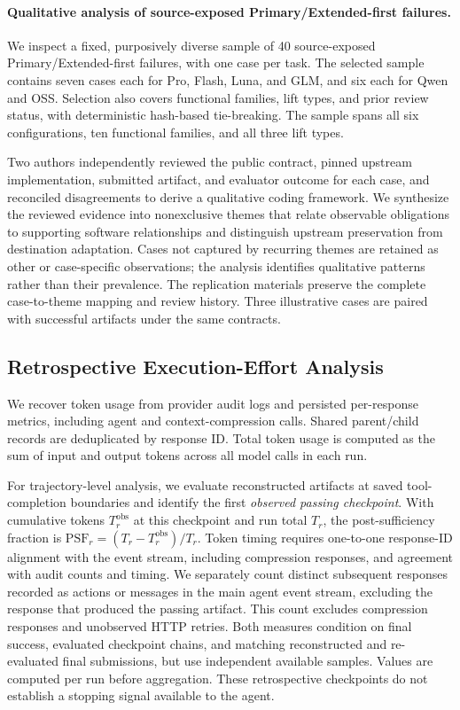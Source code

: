 \documentclass[acmsmall,screen,review,anonymous]{acmart}
\begin{document}
\paragraph{Qualitative analysis of source-exposed Primary/Extended-first failures.}
We inspect a fixed, purposively diverse sample of 40 source-exposed
Primary/Extended-first failures, with one case per task. The selected sample
contains seven cases each for Pro, Flash, Luna, and GLM, and six each for Qwen
and OSS. Selection also covers functional families, lift types, and prior
review status, with deterministic hash-based tie-breaking. The sample spans all
six configurations, ten functional families, and all three lift types.

Two authors independently reviewed the public contract, pinned upstream
implementation, submitted artifact, and evaluator outcome for each case, and
reconciled disagreements to derive a qualitative coding framework. We synthesize
the reviewed evidence into nonexclusive themes that relate observable obligations
to supporting software relationships and distinguish upstream preservation from
destination adaptation. Cases not captured by recurring themes are retained as other or case-specific
observations; the analysis identifies qualitative patterns rather than their
prevalence. The replication materials preserve the complete case-to-theme
mapping and review history. Three illustrative cases are paired with successful
artifacts under the same contracts.

\subsection{Retrospective Execution-Effort Analysis}
\label{sec:execution-effort-protocol}

We recover token usage from provider audit logs and persisted per-response
metrics, including agent and context-compression calls. Shared parent/child
records are deduplicated by response ID. Total token usage is computed as the sum of input and output tokens across all
model calls in each run.

For trajectory-level analysis, we evaluate reconstructed artifacts at saved
tool-completion boundaries and identify the first \emph{observed passing
checkpoint}. With cumulative tokens $T_r^{\mathrm{obs}}$ at this checkpoint and
run total $T_r$, the post-sufficiency fraction is
$\mathrm{PSF}_r=(T_r-T_r^{\mathrm{obs}})/T_r$.
Token timing requires one-to-one response-ID alignment with the event stream,
including compression responses, and agreement with audit counts and timing.
We separately count distinct subsequent responses recorded as actions or
messages in the main agent event stream, excluding the response that produced
the passing artifact. This count
excludes compression responses and unobserved HTTP retries. Both measures
condition on final success, evaluated checkpoint chains, and matching
reconstructed and re-evaluated final submissions, but use independent available
samples. Values are computed per run before aggregation. These retrospective
checkpoints do not establish a stopping signal available to the agent.
\end{document}
